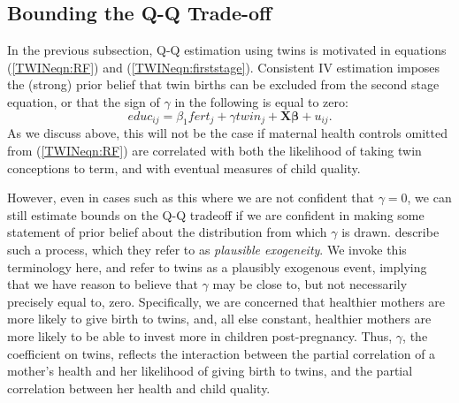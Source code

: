 \documentclass[subeqn]{article}
\begin{document}
\begin{spacing}{1.4}
\subsection{Bounding the Q-Q Trade-off}            \label{TWINsscn:methodBounds}
In the previous subsection, Q-Q estimation using twins is motivated in equations 
(\ref{TWINeqn:RF}) and (\ref{TWINeqn:firststage}).  Consistent IV estimation 
imposes the (strong) prior belief that twin births can be excluded from the 
second stage equation, or that the sign of $\gamma$ in the following is equal to 
zero:
\begin{equation}
\label{TWINeqn:Conley}
educ_{ij}=\beta_1 fert_j + \gamma twin_j + \bm{X}\bm{\beta} + u_{ij}.
\end{equation}
As we discuss above, this will not be the case if maternal health controls 
omitted from (\ref{TWINeqn:RF}) are correlated with both the likelihood of taking
twin conceptions to term, and with eventual measures of child quality.

However, even in cases such as this where we are not confident that $\gamma=0$,
we can still estimate bounds on the Q-Q tradeoff if we are confident in making
some statement of prior belief about the distribution from which $\gamma$ is 
drawn.  \citet{Conleyetal2012} describe such a process, which they refer to as 
\emph{plausible exogeneity}.  We invoke this terminology here, and refer to 
twins as a plausibly exogenous event, implying that we have reason to believe 
that $\gamma$ may be close to, but not necessarily precisely equal to, zero.
Specifically, we are concerned that healthier mothers are more likely to give
birth to twins, and, all else constant, healthier mothers are more likely to be 
able to invest more in children post-pregnancy.  Thus, $\gamma$, the coefficient 
on twins, reflects the interaction between the partial correlation of a mother's 
health and her likelihood of giving birth to twins, and the partial correlation 
between her health and child quality.


\end{spacing}
\end{document}
